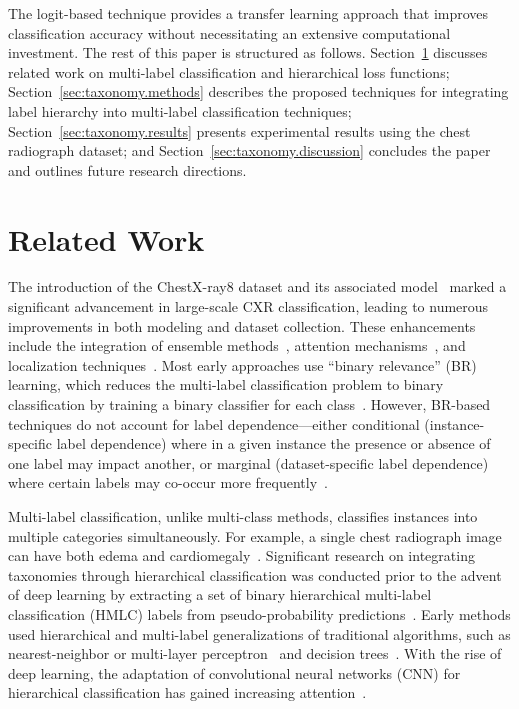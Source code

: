 \documentclass[final,1p,times,authoryear]{elsarticle}
\begin{document}
The logit-based technique provides a transfer learning approach that improves classification accuracy without necessitating an extensive computational investment. The rest of this paper is structured as follows. Section~\ref{sec:taxonomy.relatedwork} discusses related work on multi-label classification and hierarchical loss functions; Section~\ref{sec:taxonomy.methods} describes the proposed techniques for integrating label hierarchy into multi-label classification techniques; Section~\ref{sec:taxonomy.results} presents experimental results using the chest radiograph dataset; and Section~\ref{sec:taxonomy.discussion} concludes the paper and outlines future research directions.

\section{Related Work}\label{sec:taxonomy.relatedwork}
The introduction of the ChestX-ray8 dataset and its associated model~\cite{wang_ChestXRay8_2017} marked a significant advancement in large-scale CXR classification, leading to numerous improvements in both modeling and dataset collection. These enhancements include the integration of ensemble methods~\cite{islam_Abnormality_2017}, attention mechanisms~\cite{guan_Diagnose_2018,liu_SDFN_2019}, and localization techniques~\cite{cai_Iterative_2018,guendel_MultiTask_2019,li_Thoracic_2018,yan_Weakly_2018}. Most early approaches use ``binary relevance'' (BR) learning, which reduces the multi-label classification problem to binary classification by training a binary classifier for each class~\cite{zhang_Review_2014}. However, BR-based techniques do not account for label dependence---either conditional (instance-specific label dependence) where in a given instance the presence or absence of one label may impact another, or marginal (dataset-specific label dependence) where certain labels may co-occur more frequently~\cite{dembczynski_Label_2012}.

Multi-label classification, unlike multi-class methods, classifies instances into multiple categories simultaneously. For example, a single chest radiograph image can have both edema and cardiomegaly~\cite{harvey_Standardised_2019,tsoumakas_MultiLabel_2007}. Significant research on integrating taxonomies through hierarchical classification was conducted prior to the advent of deep learning by extracting a set of binary hierarchical multi-label classification (HMLC) labels from pseudo-probability predictions~\cite{bi_BayesOptimal_2015}. Early methods used hierarchical and multi-label generalizations of traditional algorithms, such as nearest-neighbor or multi-layer perceptron~\cite{pourghassem_ContentBased_2008} and decision trees~\cite{dimitrovski_Hierarchical_2011}. With the rise of deep learning, the adaptation of convolutional neural networks (CNN) for hierarchical classification has gained increasing attention~\cite{guo_CNNRNN_2018,kowsari_HDLTex_2017,redmon_YOLO9000_2017,roy_TreeCNN_2020}.
\end{document}
